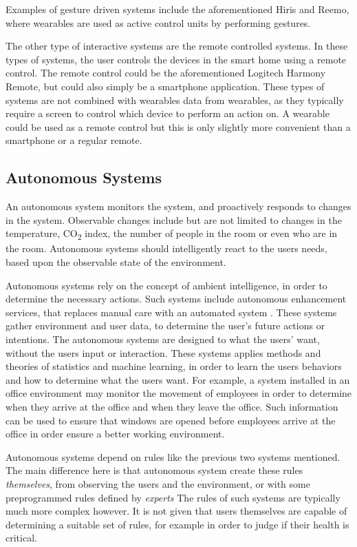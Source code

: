 Examples of gesture driven systems include the aforementioned Hiris and Reemo, 
where wearables are used as active control units by performing gestures. 

The other type of interactive systems are the remote controlled systems. 
In these types of systems, the user controls the devices in the smart home using a remote control. 
The remote control could be the aforementioned Logitech Harmony Remote, 
but could also simply be a smartphone application. 
These types of systems are not combined with wearables data from wearables, 
as they typically require a screen to control which device to perform an action on.
A wearable could be used as a remote control but this is only slightly more convenient than a smartphone or a regular remote.

\subsection{Autonomous Systems}

An autonomous system monitors the system, 
and proactively responds to changes in the system. 
Observable changes include but are not limited to changes in the temperature, 
CO\textsubscript{2} index, the number of people in the room or even who are in the room.
Autonomous systems should intelligently react to the users needs, 
based upon the observable state of the environment.

Autonomous systems rely on the concept of ambient intelligence, 
in order to determine the necessary actions.
Such systems include autonomous enhancement services, 
that replaces manual care with an automated system \cite{nehmer2006living}. 
These systems gather environment and user data, 
to determine the user's future actions or intentions. 
The autonomous systems are designed to what the users' want, 
without the users input or interaction. 
These systems applies methods and theories of statistics and machine learning, 
in order to learn the users behaviors and how to determine what the users want. 
For example, a system installed in an office environment may monitor the movement of employees in order to determine when they arrive at the office and when they leave the office. Such information can be used to ensure that windows are opened before employees arrive at the office in order ensure a better working environment.

Autonomous systems depend on rules like the previous two systems mentioned. 
The main difference here is that autonomous system create these rules \emph{themselves}, 
from observing the users and the environment, 
or with some preprogrammed rules defined by \emph{experts}
The rules of such systems are typically much more complex however. 
It is not given that users themselves are capable of determining a suitable set of rules, 
for example in order to judge if their health is critical. 

